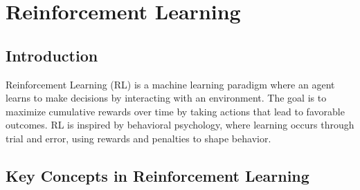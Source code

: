 \section{Reinforcement Learning}

\subsection*{Introduction}
Reinforcement Learning (RL) is a machine learning paradigm where an agent learns to make decisions by interacting with an environment. The goal is to maximize cumulative rewards over time by taking actions that lead to favorable outcomes. RL is inspired by behavioral psychology, where learning occurs through trial and error, using rewards and penalties to shape behavior.

\subsection*{Key Concepts in Reinforcement Learning}

